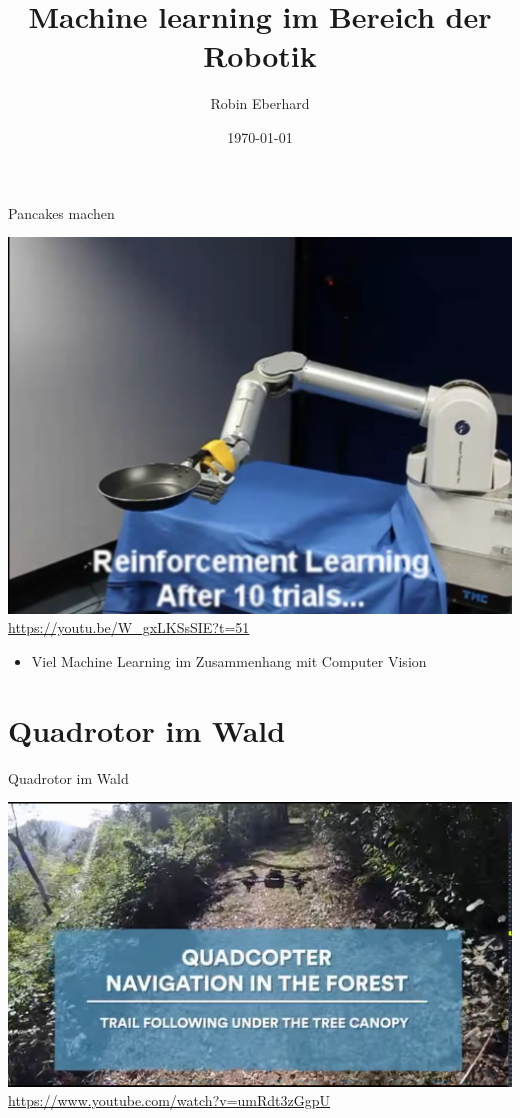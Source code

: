 \documentclass[aspectratio=1610]{beamer}
\title{Machine learning im Bereich der Robotik}
\date{\today}
\author{Robin Eberhard}
\begin{document}
  \maketitle
  \begin{frame}{Pancakes machen}
  \begin{center}
  	\includegraphics[scale=0.15]{img/pancake.png} \\
  	\url{https://youtu.be/W_gxLKSsSIE?t=51}
  \end{center}
  \end{frame}
  
  \begin{frame}
  	\begin{itemize}
  		\item Viel Machine Learning im Zusammenhang mit Computer Vision
  	\end{itemize}
  \end{frame}
  
  \section{Quadrotor im Wald}
  \begin{frame}{Quadrotor im Wald}
  \begin{center}
  	\includegraphics[scale=0.15]{img/quadrotor.png} \\
  	\url{https://www.youtube.com/watch?v=umRdt3zGgpU}
  \end{center}
  \end{frame}
  
\end{document}
